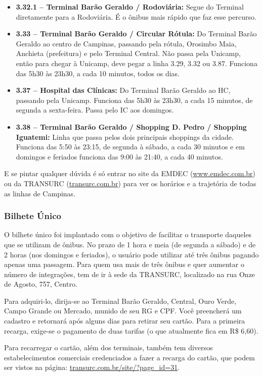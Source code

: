 \begin{itemize}
    \item  \textbf{3.32.1 -- Terminal Barão Geraldo / Rodoviária:} Segue do
        Terminal diretamente para a Rodoviária. É o ônibus mais rápido que faz
        esse percurso.

    \item  \textbf{3.33 -- Terminal Barão Geraldo / Circular Rótula:} Do
        Terminal Barão Geraldo ao centro de Campinas, passando pela rótula,
        Orosimbo Maia, Anchieta (prefeitura) e pelo Terminal Central. Não passa
        pela Unicamp, então para chegar à Unicamp, deve pegar a linha 3.29, 3.32
        ou 3.87. Funciona das 5h30 às 23h30, a cada 10 minutos, todos os dias.

    \item  \textbf{3.37 -- Hospital das Clínicas:} Do Terminal Barão Geraldo ao
        HC, passando pela Unicamp. Funciona das 5h30 às 23h30, a cada 15
        minutos, de segunda a sexta-feira. Passa pelo IC aos domingos.

    \item  \textbf{3.38 -- Terminal Barão Geraldo / Shopping D. Pedro / Shopping
        Iguatemi:} Linha que passa pelos dois principais shoppings da cidade.
        Funciona das 5:50 às 23:15, de segunda à sábado, a cada 30 minutos e em
        domingos e feriados funciona das 9:00 às 21:40, a cada 40 minutos.
\end{itemize}

E se pintar qualquer dúvida é só entrar no site da EMDEC
(\url{www.emdec.com.br}) ou da TRANSURC (\url{transurc.com.br}) para ver os
horários e a trajetória de todas as linhas de Campinas.

\subsubsection*{Bilhete Único}

O bilhete único foi implantado com o objetivo de facilitar o transporte daqueles
que se utilizam de ônibus. No prazo de 1 hora e meia (de segunda a sábado) e de
2 horas (nos domingos e feriados), o usuário pode utilizar até três ônibus
pagando apenas uma passagem. Para quem usa mais de três ônibus e quer aumentar o
número de integrações, tem de ir à sede da TRANSURC, localizado na rua Onze de
Agosto, 757, Centro.

Para adquiri-lo, dirija-se ao Terminal Barão Geraldo, Central, Ouro Verde, Campo
Grande ou Mercado, munido de seu RG e CPF. Você preencherá um cadastro e
retornará após alguns dias para retirar seu cartão. Para a primeira recarga,
exige-se o pagamento de duas tarifas (o que atualmente fica em R\$ 6,60).

Para recarregar o cartão, além dos terminais, também tem diversos
estabelecimentos comerciais credenciados a fazer a recarga do cartão, que podem
ser vistos na página: \url{transurc.com.br/site/?page_id=31}.
